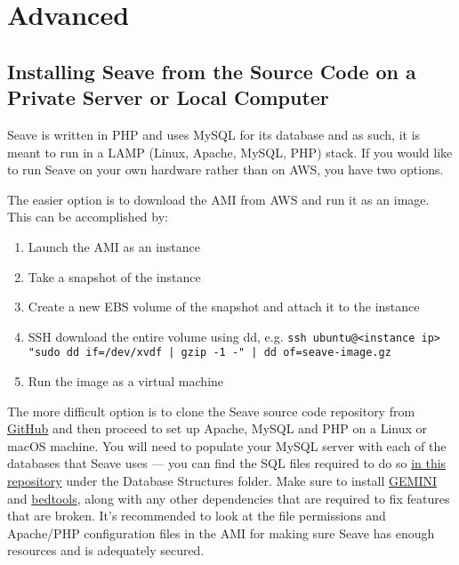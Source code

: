 \documentclass[11pt, a4paper]{article}
\newcommand{\GEMINI}{\href{https://gemini.readthedocs.io}{GEMINI} } %
\begin{document}

\section{Advanced}


\subsection{Installing Seave from the Source Code on a Private Server or Local Computer}\label{localSeaveInstallation}

Seave is written in PHP and uses MySQL for its database and as such, it is meant to run in a LAMP (Linux, Apache, MySQL, PHP) stack. If you would like to run Seave on your own hardware rather than on AWS, you have two options. 

The easier option is to download the AMI from AWS and run it as an image. This can be accomplished by:

\begin{enumerate}
\item Launch the AMI as an instance
\item Take a snapshot of the instance
\item Create a new EBS volume of the snapshot and attach it to the instance
\item SSH download the entire volume using dd, e.g. \texttt{ssh ubuntu@<instance ip> "sudo dd if=/dev/xvdf | gzip -1 -" | dd of=seave-image.gz}
\item Run the image as a virtual machine
\end{enumerate}

The more difficult option is to clone the Seave source code repository from \href{https://github.com/KCCG/seave}{GitHub} and then proceed to set up Apache, MySQL and PHP on a Linux or macOS machine. You will need to populate your MySQL server with each of the databases that Seave uses --- you can find the SQL files required to do so \href{https://github.com/KCCG/seave-databases-annotations}{in this repository} under the Database Structures folder. Make sure to install \GEMINI and \href{https://github.com/arq5x/bedtools2}{bedtools}, along with any other dependencies that are required to fix features that are broken. It's recommended to look at the file permissions and Apache/PHP configuration files in the AMI for making sure Seave has enough resources and is adequately secured.
\end{document}
